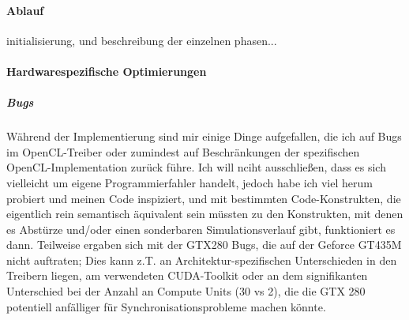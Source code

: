 	\paragraph{Ablauf}
		\label{sec:fluidSim:ablauf}
		initialisierung, und beschreibung der einzelnen phasen...

	\paragraph{Hardwarespezifische Optimierungen}
	\label{sec:hardwareOptimizations}
	
	
		\subparagraph{Bugs}
		\label{sec:oclBugs}
		Während der Implementierung sind mir einige Dinge aufgefallen, die ich auf Bugs im OpenCL-Treiber
		oder zumindest auf Beschränkungen der spezifischen OpenCL-Implementation zurück führe.
		Ich will nciht ausschließen, dass es sich vielleicht um eigene Programmierfahler handelt, jedoch habe ich
		viel herum probiert und meinen Code inspiziert, und mit bestimmten Code-Konstrukten, die eigentlich
		rein semantisch äquivalent sein müssten zu den Konstrukten, mit denen es Abstürze und/oder einen sonderbaren
		Simulationsverlauf gibt, funktioniert es dann.
		Teilweise ergaben sich mit der GTX280 Bugs, die auf der Geforce GT435M nicht auftraten;
		Dies kann z.T. an Architektur-spezifischen Unterschieden in den Treibern liegen, am verwendeten
		CUDA-Toolkit oder an dem signifikanten Unterschied bei der Anzahl an Compute Units (30 vs 2), die die
		GTX 280 potentiell anfälliger für Synchronisationsprobleme machen könnte.
		
